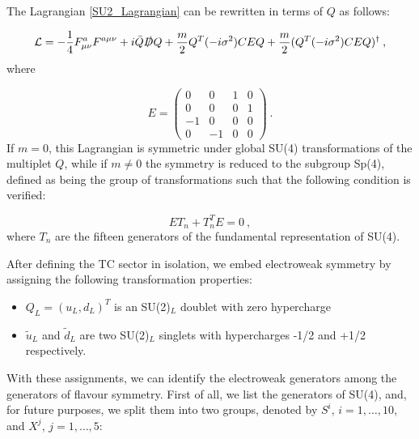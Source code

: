 \begin{center}
\end{center}

The Lagrangian \ref{SU2_Lagrangian}  can be rewritten in terms of $Q$ as follows:

\begin{equation}
\mathcal L = - \frac{1}{4} F_{\mu\nu}^a F^{a\mu\nu}  + i \bar Q \slashed D Q  + \frac{m}{2} Q^T (-i \sigma^2) C E Q +  \frac{m}{2} (Q^T (-i \sigma^2) C E Q)^{\dagger} \: ,
\label{SU2_Lagrangian2}
\end{equation}
%
where

\begin{equation}
E =
\begin{pmatrix}
0 & 0 & 1 & 0 \\
0 & 0 & 0 & 1 \\
-1 & 0 & 0 & 0 \\
 0 & -1 & 0 & 0
\end{pmatrix} \: .
\end{equation}
%
If $m=0$, this Lagrangian is symmetric under global SU(4) transformations of the multiplet $Q$, while if $m \neq 0$ the symmetry is reduced to the subgroup Sp(4), defined as being the group of transformations such that the following condition is verified:

\begin{equation}
E T_n + T_n^T E = 0\: ,
\end{equation}
%
where $T_n$ are the fifteen generators of the fundamental representation of SU(4).

After defining the  TC sector in isolation, we  embed electroweak symmetry by assigning the following transformation properties:

\begin{itemize}
\item $Q_L = (u_L,d_L)^T$ is an SU(2)$_L$ doublet with zero hypercharge
\item $\tilde u_L$  and $\tilde d_L$ are two SU(2)$_L$ singlets with hypercharges -1/2 and +1/2 respectively. 
\end{itemize}
%
With these assignments, we can identify the electroweak generators among the generators of flavour symmetry. First of all, we list the generators of SU(4), and, for future purposes, we split them into two groups, denoted by $S^i$, $i = 1, \dots , 10$, and $X^j$, $j = 1, \dots, 5$:


